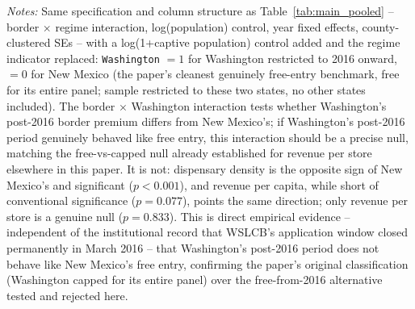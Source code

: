 \begin{table}[htbp]
\centering
\caption{Robustness check: Washington (2016 onward) vs.\ New Mexico, same specification as Table~\ref{tab:main_pooled}}
\label{tab:wa_vs_nm}
\footnotesize
{}
\begin{minipage}{0.98\textwidth}
\vspace{0.3em}
\footnotesize
\textit{Notes:} Same specification and column structure as Table~\ref{tab:main_pooled} -- border $\times$
regime interaction, log(population) control, year fixed effects, county-clustered SEs -- with a
log(1+captive population) control added and the regime indicator replaced: \texttt{Washington} $=1$ for
Washington restricted to 2016 onward, $=0$ for New Mexico (the paper's cleanest genuinely free-entry
benchmark, free for its entire panel; sample restricted to these two states, no other states included). The
border $\times$ Washington interaction tests whether Washington's post-2016 border premium differs from New
Mexico's; if Washington's post-2016 period genuinely behaved like free entry, this interaction should be a
precise null, matching the free-vs-capped null already established for revenue per store elsewhere in this
paper. It is not: dispensary density is the opposite sign of New Mexico's and significant ($p<0.001$), and
revenue per capita, while short of conventional significance ($p=0.077$), points the same direction; only
revenue per store is a genuine null ($p=0.833$). This is direct empirical evidence -- independent of the
institutional record that WSLCB's application window closed permanently in March 2016 -- that Washington's
post-2016 period does not behave like New Mexico's free entry, confirming the paper's original classification
(Washington capped for its entire panel) over the free-from-2016 alternative tested and rejected here.
\end{minipage}
\end{table}
